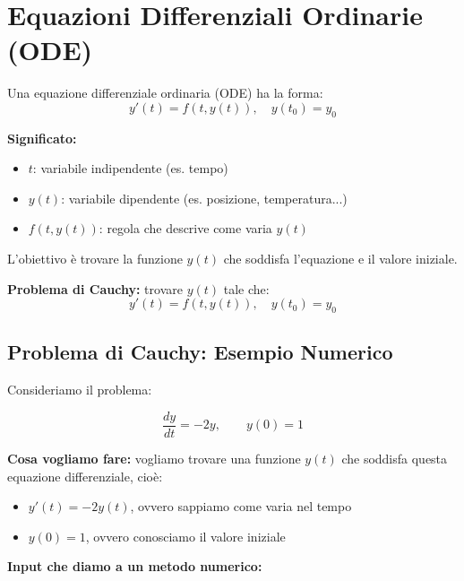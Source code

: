 \documentclass[12pt,a4paper]{article}
\begin{document}
\section*{Equazioni Differenziali Ordinarie (ODE)}

\begin{flushleft}
Una equazione differenziale ordinaria (ODE) ha la forma:
\begin{equation*}
y'(t) = f(t, y(t)), \quad y(t_0) = y_0
\end{equation*}

\textbf{Significato:}
\begin{itemize}
  \item \(t\): variabile indipendente (es. tempo)
  \item \(y(t)\): variabile dipendente (es. posizione, temperatura...)
  \item \(f(t, y(t))\): regola che descrive come varia \(y(t)\)
\end{itemize}

L'obiettivo \`e trovare la funzione \(y(t)\) che soddisfa l'equazione e il valore iniziale.

\textbf{Problema di Cauchy:} trovare \(y(t)\) tale che:
\begin{equation*}
y'(t) = f(t, y(t)), \quad y(t_0) = y_0
\end{equation*}

\subsection*{Problema di Cauchy: Esempio Numerico}

Consideriamo il problema:

\[
\frac{dy}{dt} = -2y, \qquad y(0) = 1
\]

\vspace{0.5em}
\textbf{Cosa vogliamo fare:} vogliamo trovare una funzione \( y(t) \) che soddisfa questa equazione differenziale, cioè:

\begin{itemize}
    \item \( y'(t) = -2y(t) \), ovvero sappiamo come varia nel tempo
    \item \( y(0) = 1 \), ovvero conosciamo il valore iniziale
\end{itemize}

\vspace{0.5em}
\textbf{Input che diamo a un metodo numerico:}


\end{flushleft}
\end{document}
